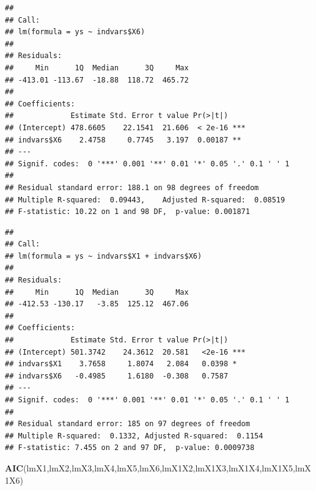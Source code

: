 \documentclass[
]{book}
\newenvironment{Shaded}{\begin{snugshade}}{\end{snugshade}}
\newcommand{\KeywordTok}[1]{\textcolor[rgb]{0.13,0.29,0.53}{\textbf{#1}}}
\newcommand{\NormalTok}[1]{#1}
\newcommand{\OperatorTok}[1]{\textcolor[rgb]{0.81,0.36,0.00}{\textbf{#1}}}
\newcommand{\StringTok}[1]{\textcolor[rgb]{0.31,0.60,0.02}{#1}}
\begin{document}
\begin{Shaded}
\end{Shaded}

\begin{verbatim}
## 
## Call:
## lm(formula = ys ~ indvars$X6)
## 
## Residuals:
##     Min      1Q  Median      3Q     Max 
## -413.01 -113.67  -18.88  118.72  465.72 
## 
## Coefficients:
##             Estimate Std. Error t value Pr(>|t|)    
## (Intercept) 478.6605    22.1541  21.606  < 2e-16 ***
## indvars$X6    2.4758     0.7745   3.197  0.00187 ** 
## ---
## Signif. codes:  0 '***' 0.001 '**' 0.01 '*' 0.05 '.' 0.1 ' ' 1
## 
## Residual standard error: 188.1 on 98 degrees of freedom
## Multiple R-squared:  0.09443,	Adjusted R-squared:  0.08519 
## F-statistic: 10.22 on 1 and 98 DF,  p-value: 0.001871
\end{verbatim}

\begin{Shaded}
\end{Shaded}

\begin{verbatim}
## 
## Call:
## lm(formula = ys ~ indvars$X1 + indvars$X6)
## 
## Residuals:
##     Min      1Q  Median      3Q     Max 
## -412.53 -130.17   -3.85  125.12  467.06 
## 
## Coefficients:
##             Estimate Std. Error t value Pr(>|t|)    
## (Intercept) 501.3742    24.3612  20.581   <2e-16 ***
## indvars$X1    3.7658     1.8074   2.084   0.0398 *  
## indvars$X6   -0.4985     1.6180  -0.308   0.7587    
## ---
## Signif. codes:  0 '***' 0.001 '**' 0.01 '*' 0.05 '.' 0.1 ' ' 1
## 
## Residual standard error: 185 on 97 degrees of freedom
## Multiple R-squared:  0.1332,	Adjusted R-squared:  0.1154 
## F-statistic: 7.455 on 2 and 97 DF,  p-value: 0.0009738
\end{verbatim}

\begin{Shaded}
\begin{Highlighting}[]
\KeywordTok{AIC}\NormalTok{(lmX1,lmX2,lmX3,lmX4,lmX5,lmX6,lmX1X2,lmX1X3,lmX1X4,lmX1X5,lmX1X6)}
\end{Highlighting}
\end{Shaded}
\end{document}
